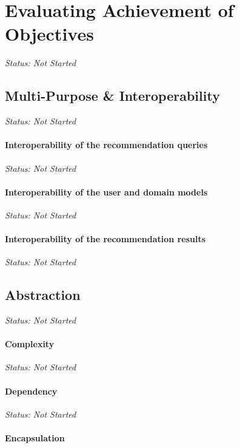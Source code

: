 \chapter{Evaluating Achievement of Objectives}

\emph{Status: Not Started}

\section{Multi-Purpose \& Interoperability}

\emph{Status: Not Started}

\subsubsection{Interoperability of the recommendation queries}

\emph{Status: Not Started}

\subsubsection{Interoperability of the user and domain models}

\emph{Status: Not Started}

\subsubsection{Interoperability of the recommendation results}

\emph{Status: Not Started}

\section{Abstraction}

\emph{Status: Not Started}

\subsubsection{Complexity}

\emph{Status: Not Started}

\subsubsection{Dependency}

\emph{Status: Not Started}

\subsubsection{Encapsulation}


